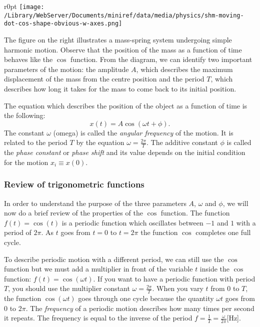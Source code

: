 \documentclass[letterpaper,9pt,journal]{IEEEtran}
\newcommand{\be}{\begin{equation}}
\newcommand{\ee}{\end{equation}}
\begin{document}

\begin{wrapfigure}{r}{0pt}
\texttt{[image: /Library/WebServer/Documents/miniref/data/media/physics/shm-moving-dot-cos-shape-obvious-w-axes.png]}
\end{wrapfigure}

\noindent
The figure on the right illustrates a mass-spring system undergoing simple harmonic motion. 
Observe that the position of the mass as a function of time behaves like the $\cos$ function. 
From the diagram, we can identify two important parameters of the motion:  the amplitude $A$, 
which describes the maximum displacement of the mass from the centre position
and the period $T$, which describes how long it takes for the mass to come back to its initial position.

The equation which describes the position of the object as a function of time is the following:  
\be
 x(t)=A\cos(\omega t   + \phi).
 \label{SHM-x}
\ee
The constant $\omega$ (omega) is called the \emph{angular frequency} of the motion.
It is related to the period $T$ by the equation $\omega = \frac{2\pi}{T}$.
The additive constant $\phi$ is called the \emph{phase constant} or \emph{phase shift}
and its value depends on the initial condition for the motion $x_i\equiv x(0)$.

\subsubsection{Review of trigonometric functions}
In order to understand the purpose of the three parameters $A$, $\omega$ and $\phi$,
we will now do a brief review of the properties of the $\cos$ function.
%
The function %
$f(t)=\cos(t)$ is a periodic function which oscillates between $-1$ and $1$ with a period of $2\pi$.
As $t$ goes from $t=0$ to $t=2\pi$ the function $\cos$ completes one full cycle.

To describe periodic motion with a different period, 
we can still use the $\cos$ function but we must add 
a multiplier in front of the variable $t$ inside the $\cos$ function: 
$f(t) = \cos(\omega t )$.
%
If you want to have a periodic function with period $T$,
you should use the multiplier constant $\omega = \frac{2\pi}{T}$.
When you vary $t$ from $0$ to $T$, the function $\cos(\omega t )$
goes through one cycle because the quantity $\omega t$ goes from $0$ to $2\pi$.
The \emph{frequency} of a periodic motion describes how many times per second it repeats. 
The frequency is equal to the inverse of the period $f=\frac{1}{T}=\frac{\omega}{2\pi}$[Hz].
\end{document}
